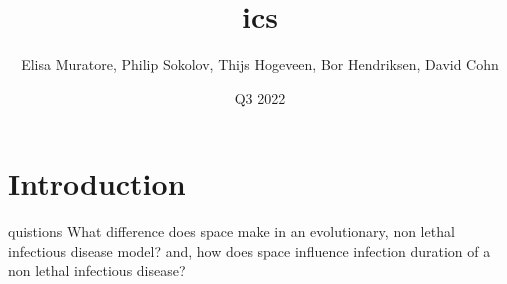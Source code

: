 \documentclass{article}
\title{ics}
\author{Elisa Muratore, Philip Sokolov, Thijs Hogeveen, Bor Hendriksen, David Cohn}
\date{Q3 2022}
\begin{document}
\maketitle

\section{Introduction}

\research quistions {What difference does space make in an evolutionary, non lethal infectious disease model? and, how does space influence infection duration of a non lethal infectious disease?}
\end{document}
